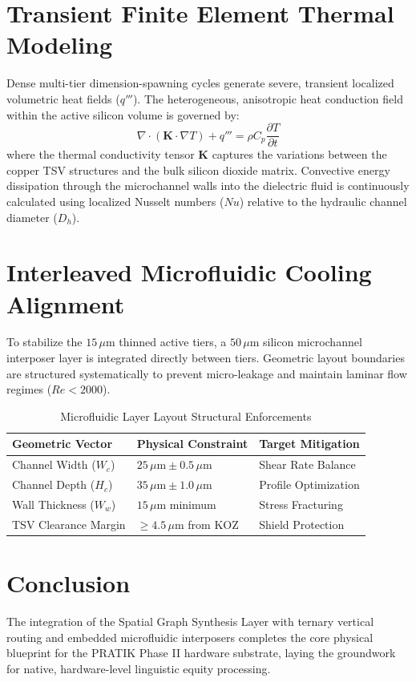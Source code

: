 \documentclass[journal,twocolumn,10pt]{IEEEtran}
\begin{document}
\section{Transient Finite Element Thermal Modeling}
Dense multi-tier dimension-spawning cycles generate severe, transient localized volumetric heat fields ($q'''$). The heterogeneous, anisotropic heat conduction field within the active silicon volume is governed by:
\begin{equation}
\nabla \cdot (\mathbf{K} \cdot \nabla T) + q''' = \rho C_p \frac{\partial T}{\partial t}
\end{equation}
where the thermal conductivity tensor $\mathbf{K}$ captures the variations between the copper TSV structures and the bulk silicon dioxide matrix. Convective energy dissipation through the microchannel walls into the dielectric fluid is continuously calculated using localized Nusselt numbers ($Nu$) relative to the hydraulic channel diameter ($D_h$).

\section{Interleaved Microfluidic Cooling Alignment}
To stabilize the $15\,\mu\text{m}$ thinned active tiers, a $50\,\mu\text{m}$ silicon microchannel interposer layer is integrated directly between tiers. Geometric layout boundaries are structured systematically to prevent micro-leakage and maintain laminar flow regimes ($Re < 2000$).

\begin{table}[h]
\centering
\caption{Microfluidic Layer Layout Structural Enforcements}
\begin{tabular}{lll}
\toprule
Geometric Vector & Physical Constraint & Target Mitigation \\
\midrule
Channel Width ($W_c$) & $25\,\mu\text{m} \pm 0.5\,\mu\text{m}$ & Shear Rate Balance \\
Channel Depth ($H_c$) & $35\,\mu\text{m} \pm 1.0\,\mu\text{m}$ & Profile Optimization \\
Wall Thickness ($W_w$) & $15\,\mu\text{m}$ minimum & Stress Fracturing \\
TSV Clearance Margin & $\ge 4.5\,\mu\text{m}$ from KOZ & Shield Protection \\
\bottomrule
\end{tabular}
\end{table}

\section{Conclusion}
The integration of the Spatial Graph Synthesis Layer with ternary vertical routing and embedded microfluidic interposers completes the core physical blueprint for the PRATIK Phase II hardware substrate, laying the groundwork for native, hardware-level linguistic equity processing.



\end{document}
